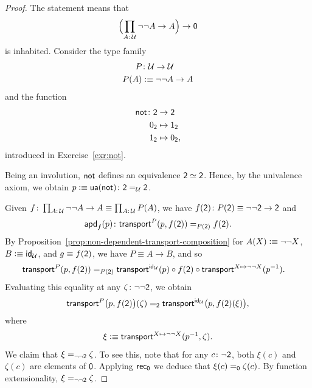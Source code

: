 \begin{proof}
    The statement means that
    \begin{equation}\label{eq:notnotA-to-A}
        \Bigl(\prod_{A\colon\univ}\neg\neg A\to A\Bigr)\to\fun0
    \end{equation}
    is inhabited. Consider the type family
    \begin{align*}
        P&\colon\univ\to\univ\\
        P(A)&\defeq\neg\neg A\to A
    \end{align*}
    and the function
    \begin{align*}
        \fun{not}\colon\fun2&\to\fun2\\
        0_{\fun2}&\mapsto1_{\fun2}\\
        1_{\fun2}&\mapsto0_{\fun2},
    \end{align*}
    introduced in Exercise~\ref{exr:not}.
     
    Being an involution, $\mathsf{not}$ defines an equivalence $\mathsf{2}\simeq\mathsf{2}$. Hence, by the univalence axiom, we obtain $p\defeq\fun{ua}(\fun{not})\colon\fun2\eq{\univ}\fun2$.

    Given $f\colon\prod_{A\colon\univ}\neg\neg A\to A\equiv\prod_{A\colon\univ}P(A)$, we have $f(\fun2)\colon P(\fun2)\equiv\neg\neg\fun2\to\fun2$ and
    \begin{equation}\label{eq:f(2)}
        \fun{apd}_f(p)\colon\fun{transport}^P(p,f(\fun2))\eq{P(\fun2)}f(\fun2).
    \end{equation}
    By Proposition~\ref{prop:non-dependent-transport-composition} for $A(X)\mathrel{\vcentcolon}\equiv\neg\neg X$, $B\mathrel{\vcentcolon}\equiv\mathsf{id}_\mathcal U$, and $g\equiv f(\mathsf{2})$, we have $P\equiv A\to B$, and so
    \begin{align*}
        \mathsf{transport}^P(p,f(\mathsf{2}))
            &\mathrel{=_{P(\mathsf{2})}}
                \mathsf{transport}^{\mathsf{id}_\mathcal U}(p)
                    \circ f(\mathsf{2})
                    \circ 
                    \mathsf{transport}^{X\mapsto\neg\neg X}(p^{-1}).
    \end{align*}
    Evaluating this equality at any $\zeta\colon\neg\neg\fun2$, we obtain
    \begin{align*}
        \mathsf{transport}^P\bigl(p,f(\mathsf{2})\bigr)(\zeta)
            \mathrel{=_{\mathsf{2}}}
            \mathsf{transport}^{\mathsf{id}_\mathcal U}\bigl(p,f(\mathsf{2})(\xi)\bigr),
    \end{align*}
    where
    \[
        \xi\mathrel{\vcentcolon}\equiv\mathsf{transport}^{X\mapsto\neg\neg X}(p^{-1},\zeta).
    \]
    We claim that $\xi\mathrel{=_{\neg\neg\mathsf{2}}}\zeta$. To see this, note that for any $c\colon\neg\fun2$, both $\xi(c)$ and $\zeta(c)$ are elements of $\mathsf{0}$. Applying $\mathsf{rec}_{\mathsf{0}}$ we deduce that $\xi(c)\mathrel{=_{\mathsf{0}}}\zeta(c)$. By function extensionality, $\xi\mathrel{=_{\neg\neg\mathsf{2}}}\zeta$. 


\end{proof}
